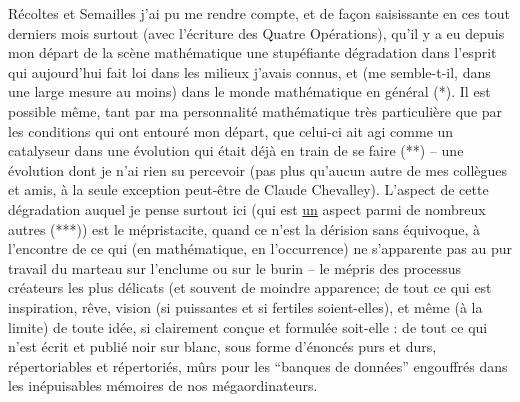 Récoltes et Semailles j'ai pu me rendre compte, et de façon saisissante en ces tout derniers mois surtout (avec l'écriture des Quatre Opérations), qu'il y a eu depuis mon départ de la scène mathématique une stupéfiante d\enspace é\enspace g\enspace r\enspace a\enspace d\enspace a\enspace t\enspace i\enspace o\enspace n dans l'esprit qui aujourd'hui fait loi dans les milieux  j'avais connus, et (me semble-t-il, dans une large mesure au moins) dans le monde mathématique en général (*). Il est possible même, tant par ma personnalité mathématique très particulière que par les conditions qui ont entouré mon départ, que celui-ci ait agi comme un catalyseur dans une évolution qui était déjà en train de se faire (**) -- une évolution dont je n'ai rien su percevoir (pas plus qu'aucun autre de mes collègues et amis, à la seule exception peut-être de Claude Chevalley). L'aspect de cette dégradation auquel je pense surtout ici (qui est \uline{un} aspect parmi de nombreux autres (***)) est le m\enspace é\enspace p\enspace r\enspace i\enspace s\quad t\enspace a\enspace c\enspace i\enspace t\enspace e, quand ce n'est la dérision sans équivoque, à l'encontre de ce qui (en mathématique, en l'occurrence) ne s'apparente pas au pur travail du marteau sur l'enclume ou sur le burin -- le mépris des processus créateurs les plus délicats (et  souvent de moindre apparence\inserted{)}; de tout ce qui est  i\enspace n\enspace s\enspace p\enspace i\enspace r\enspace a\enspace t\enspace i\enspace o\enspace n, r\enspace ê\enspace v\enspace e, v\enspace i\enspace s\enspace i\enspace o\enspace n (si puissantes et si fertiles soient-elles), et même (à la limite) de toute i\enspace d\enspace é\enspace e, si clairement conçue et formulée soit-elle : de tout ce qui n'est écrit et p\enspace u\enspace b\enspace l\enspace i\enspace é noir sur blanc, sous forme d'énoncés purs et durs, répertoriables et répertoriés, mûrs pour les ``banques de données'' engouffrés dans les inépuisables mémoires de nos mégaordinateurs.


